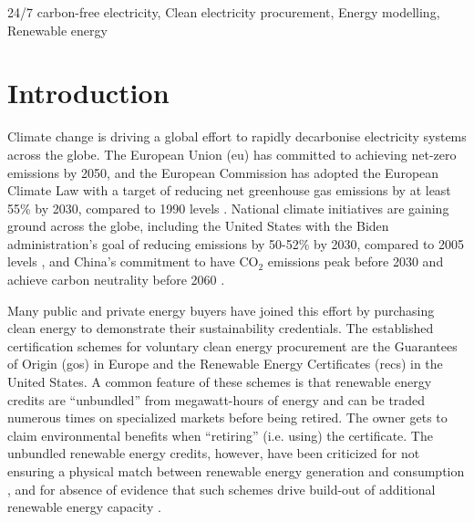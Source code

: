 \documentclass[11pt, 5p, nopreprintline]{elsarticle}
\begin{document}
\begin{frontmatter}
\begin{abstract}
\end{abstract}

	\begin{keyword}
		24/7 carbon-free electricity,
		Clean electricity procurement,
		Energy modelling,
		Renewable energy
	\end{keyword}


\end{frontmatter}


\section{Introduction}
\label{sec:intro}



Climate change is driving a global effort to rapidly decarbonise electricity systems across the globe.
The European Union (\gls{eu}) has committed to achieving net-zero emissions by 2050, and the European Commission has adopted the European Climate Law with a target of reducing net greenhouse gas emissions by at least 55\% by 2030, compared to 1990 levels \cite{EuropeanClimateLaw2020}.
National climate initiatives are gaining ground across the globe, including the United States with the Biden administration's goal of reducing emissions by 50-52\% by 2030, compared to 2005 levels \cite{BidenClimatePlan2021}, and China's commitment to have CO$_2$ emissions peak before 2030 and achieve carbon neutrality before 2060 \cite{ChinaNetZero-IEA}.


Many public and private energy buyers have joined this effort by purchasing clean energy to demonstrate their sustainability credentials.
The established certification schemes for voluntary clean energy procurement are the Guarantees of Origin (\gls{go}s) in Europe and the Renewable Energy Certificates (\gls{rec}s) in the United States.
A common feature of these schemes is that renewable energy credits are \enquote{unbundled} from megawatt-hours of energy and can be traded numerous times on specialized markets before being retired.
The owner gets to claim environmental benefits when \enquote{retiring} (i.e. using) the certificate.
The unbundled renewable energy credits, however, have been criticized for not ensuring a physical match between renewable energy generation and consumption \cite{spglobal-recs, bock-icelandGOproblem, re100report-2020}, and for absence of evidence that such schemes drive build-out of additional renewable energy capacity \cite{bjorn-RECSnatcom-2022, gillenwater-2014}.
\end{document}
